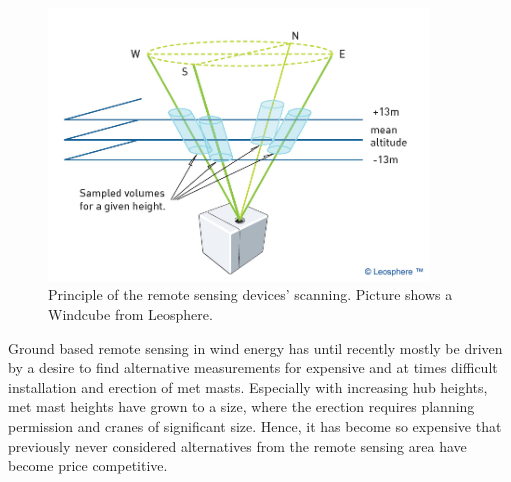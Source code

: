 \begin{figure}[h!]
\includegraphics[width=0.9\textwidth]{figures/leosphere_lidar_schematic.jpg}
\caption{Principle of the remote sensing devices’ scanning. Picture shows a Windcube from Leosphere.}
\label{fig:remote_sensing_principle}
\end{figure}



Ground based remote sensing in wind energy has until recently mostly be driven by a desire to find alternative measurements for expensive and at times difficult installation and erection of met masts. Especially with increasing hub heights, met mast heights have grown to a size, where the erection requires planning permission and cranes of significant size. Hence, it has become so expensive that previously never considered alternatives from the remote sensing area have become price competitive. 

